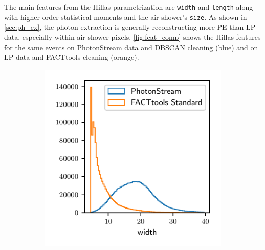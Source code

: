 The main features from the Hillas parametrization are \texttt{width} and
\texttt{length} along with higher order statistical moments and the
air-shower's \texttt{size}. As shown in \autoref{sec:ph_ex}, the photon
extraction is generally reconstructing more PE than LP data, especially within
air-shower pixels. \autoref{fig:feat_comp} shows the Hillas features for the
same events on PhotonStream data and DBSCAN cleaning (blue) and on LP data and
FACTtools cleaning (orange).
%
\begin{figure}
  \begin{subfigure}{0.5\textwidth}
    \centering
    \includegraphics[width=\textwidth, page=1]{Plots/std_phs_comparison_hist_same_DBSCAN_crab.pdf}
  \end{subfigure}
  \begin{subfigure}{0.5\textwidth}
    \centering

\end{subfigure}
\end{figure}
